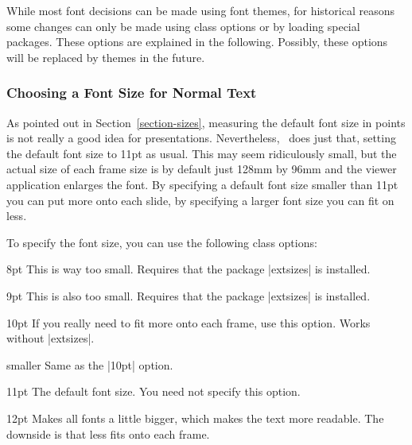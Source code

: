 While most font decisions can be made using font themes, for historical reasons some changes can only be made using class options or by loading special packages. These options are explained in the following. Possibly, these options will be replaced by themes in the future.

\subsubsection{Choosing a Font Size for Normal Text}

As pointed out in Section~\ref{section-sizes}, measuring the default font size in points is not really a good idea for presentations. Nevertheless, \beamer\ does just that, setting the default font size to 11pt as usual. This may seem ridiculously small, but the actual size of each frame size is by default just 128mm by 96mm and the viewer application enlarges the font. By specifying a default font size smaller than 11pt you can put more onto each slide, by specifying a larger font size you can fit on less.

To specify the font size, you can use the following class options:

\begin{classoption}{8pt}
  This is way too small. Requires that the package |extsizes| is installed.
\end{classoption}

\begin{classoption}{9pt}
  This is also too small. Requires that the package |extsizes| is installed.
\end{classoption}

\begin{classoption}{10pt}
  If you really need to fit more onto each frame, use this option. Works without |extsizes|.
\end{classoption}

\begin{classoption}{smaller}
  Same as the |10pt| option. \end{classoption}

\begin{classoption}{11pt}
  The default font size. You need not specify this option.
\end{classoption}

\begin{classoption}{12pt}
  Makes all fonts a little bigger, which makes the text more readable. The downside is that less fits onto each frame.
\end{classoption}

